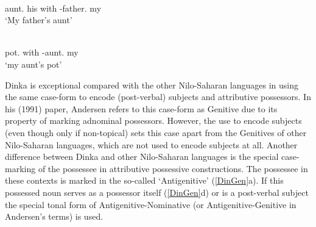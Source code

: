 \begin{exe}\ex\label{TurGenKin}
\begin{xlist}
\ex\gll{}   \textbf{} \\
aunt.\acc{} his with \NC{}-father.\acc{} my\\
\glt `My father's aunt' %

\ex\gll {}  \textbf{} \\
pot.\acc{} with \NC{}-aunt.\acc{} my\\
\glt `my aunt's pot' %
\end{xlist}
\end{exe}

Dinka is exceptional compared with the other Nilo-Saharan languages in using the same case-form to encode (post-verbal) subjects and attributive possessors. 
In his (1991) paper, Andersen refers to this case-form as Genitive due to its property of marking adnominal possessors. 
However, the use to encode subjects (even though only if non-topical) sets this case apart from the Genitives of other Nilo-Saharan languages, which are not used to encode subjects at all. 
Another difference between Dinka and other Nilo-Saharan languages is the special case-marking of the possessee in attributive possessive constructions. 
The possessee in these contexts is marked in the so-called `Antigenitive' (\ref{DinGen}a).
If this possessed noun serves as a possessor itself (\ref{DinGen}d) or is a post-verbal subject the special tonal form of Antigenitive-Nominative (or Antigenitive-Genitive in Andersen's terms) is used.  

